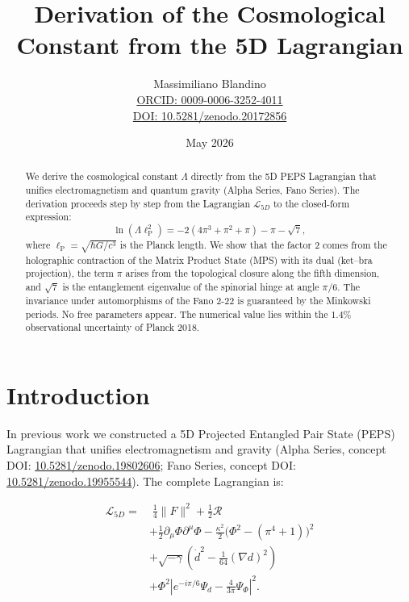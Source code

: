 \documentclass[12pt]{article}
\title{Derivation of the Cosmological Constant from the 5D Lagrangian}
\author{Massimiliano Blandino \\ 
\href{https://orcid.org/0009-0006-3252-4011}{ORCID: 0009-0006-3252-4011} \\
\href{https://doi.org/10.5281/zenodo.20172856}{DOI: 10.5281/zenodo.20172856}}
\date{May 2026}
\begin{document}
\maketitle

\begin{abstract}
We derive the cosmological constant \(\Lambda\) directly from the 5D PEPS Lagrangian that unifies electromagnetism and quantum gravity (Alpha Series, Fano Series). The derivation proceeds step by step from the Lagrangian \(\mathcal{L}_{5D}\) to the closed-form expression:
\[
\ln(\Lambda \ell_{\text{P}}^2) = -2(4\pi^3 + \pi^2 + \pi) - \pi - \sqrt{7},
\]
where \(\ell_{\text{P}} = \sqrt{\hbar G / c^3}\) is the Planck length. We show that the factor \(2\) comes from the holographic contraction of the Matrix Product State (MPS) with its dual (ket–bra projection), the term \(\pi\) arises from the topological closure along the fifth dimension, and \(\sqrt{7}\) is the entanglement eigenvalue of the spinorial hinge at angle \(\pi/6\). The invariance under automorphisms of the Fano 2-22 is guaranteed by the Minkowski periods. No free parameters appear. The numerical value lies within the \(1.4\%\) observational uncertainty of Planck 2018.
\end{abstract}

\section{Introduction}

In previous work we constructed a 5D Projected Entangled Pair State (PEPS) Lagrangian that unifies electromagnetism and gravity (Alpha Series, concept DOI: \href{https://doi.org/10.5281/zenodo.19802606}{10.5281/zenodo.19802606}; Fano Series, concept DOI: \href{https://doi.org/10.5281/zenodo.19955544}{10.5281/zenodo.19955544}). The complete Lagrangian is:

\begin{equation}\label{eq:L5D}
\boxed{
\begin{aligned}
\mathcal{L}_{5D} = &\;\frac{1}{4}\|F\|^2 + \frac{1}{2}\mathcal{R} \\
&+ \frac{1}{2}\partial_\mu\Phi\partial^\mu\Phi - \frac{\kappa^2}{2}\bigl(\Phi^2 - (\pi^4+1)\bigr)^2 \\
&+ \sqrt{-\gamma}\left(\dot{d}^2 - \frac{1}{64}(\nabla d)^2\right) \\
&+ \Phi^2 \left| e^{-i\pi/6}\Psi_d - \frac{4}{3\pi}\Psi_\Phi \right|^2 .
\end{aligned}
}
\end{equation}
\end{document}
